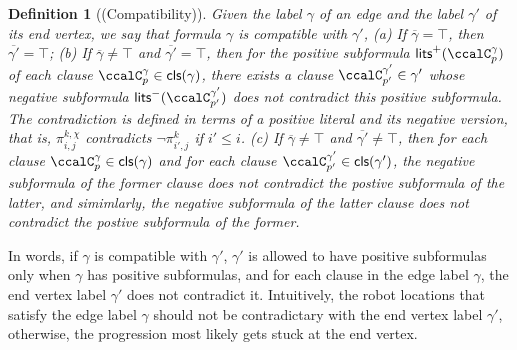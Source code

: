 \documentclass[Afour,sageh,times]{sagej}
\newtheorem{defn}[thm]{Definition}
\renewcommand{\ap}[3]{\mathcal{\pi}_{{#1},{#2}}^{#3}}
\begin{document}
  \begin{defn}[(Compatibility)]\label{defn:compatibility}
Given the label $\gamma$ of an edge and the  label $\gamma'$ of its end vertex, we say that formula  $\gamma$ is compatible with  $\gamma'$, {\it (a)} If $\overline{\gamma} = \top$, then $\overline{\gamma'} = \top$; {\it (b)} If $\overline{\gamma} \neq \top$ and $\overline{\gamma'}= \top$, then for the positive subformula $\mathsf{lits}^+(\ccalC_p^\gamma)$ of each clause $\ccalC_p^\gamma \in \mathsf{cls}(\gamma)$, there exists a clause $\ccalC_{p'}^{\gamma'} \in \gamma'$ whose negative subformula $\mathsf{lits}^-(\ccalC_{p'}^{\gamma'})$  does  not contradict this positive subformula. The contradiction is defined in terms of a positive literal and its negative version, that is, $\ap{i}{j}{k,\chi}$  contradicts  $\neg\ap{i'}{j}{k}$ if $i' \leq i$.
{\it (c)} If $\overline{\gamma} \neq \top$ and $\overline{\gamma'} \neq \top$, then for each clause $\ccalC_p^\gamma \in \mathsf{cls}(\gamma)$ and for each clause $\ccalC_{p'}^{\gamma'} \in \mathsf{cls}(\gamma')$, the negative subformula of the former clause does not contradict the postive subformula of the latter, and simimlarly, the negative subformula of the latter clause does not contradict the postive subformula of the former.
  \end{defn}
  In words, if $\gamma$ is compatible with $\gamma'$, $\gamma'$ is allowed to have positive subformulas only when $\gamma$ has positive subformulas, and for each clause in the edge label $\gamma$, the end vertex label $\gamma'$ does not contradict it. Intuitively, the robot locations that satisfy the edge label $\gamma$ should not be contradictary with  the end vertex label $\gamma'$, otherwise, the progression most likely gets stuck at the end vertex.
\end{document}
